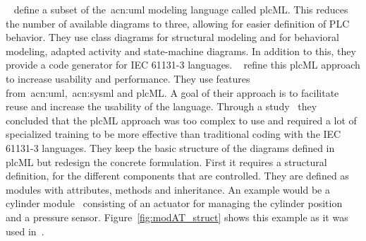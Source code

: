 \citeauthor{WITSCH2015}~\cite{WITSCH2015, WITSCH20117866} define a subset of the~\acrshort{acn:uml} modeling language called plcML.
This reduces the number of available diagrams to three, allowing for easier definition of PLC behavior.
They use class diagrams for structural modeling and for behavioral modeling, adapted activity and state-machine diagrams.
In addition to this, they provide a code generator for IEC 61131-3 languages.
\citeauthor{Obermeier:2015aa}~\cite{Obermeier:2015aa} refine this plcML approach to increase usability and performance.
They use features from~\acrshort{acn:uml},~\acrshort{acn:sysml} and plcML.
A goal of their approach is to facilitate reuse and increase the usability of the language.
Through a study~\cite{6315074} they concluded that the plcML approach was too complex to use and required a lot of specialized training to be more effective than traditional coding with the IEC 61131-3 languages.
They keep the basic structure of the diagrams defined in plcML but redesign the concrete formulation.
First it requires a structural definition, for the different components that are controlled.
They are defined as modules with attributes, methods and inheritance.
An example would be a cylinder module~\cite{Obermeier:2015aa} consisting of an actuator for managing the cylinder position and a pressure sensor.
Figure~\ref{fig:modAT_struct} shows this example as it was used in~\cite{Obermeier:2015aa}.
